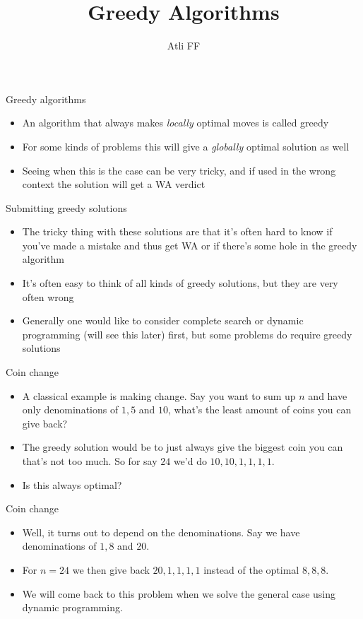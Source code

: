 \documentclass{beamer}
\title{Greedy Algorithms}
\author{Atli FF}
\institute{\href{http://ru.is/td}{School of Computer Science} \\[2pt] \href{http://ru.is}{Reykjavík University}}
\begin{document}
\maketitle

\begin{frame}[plain]{Greedy algorithms}
    \begin{itemize}
        \item An algorithm that always makes \textit{locally} optimal moves is called greedy
        \item For some kinds of problems this will give a \textit{globally} optimal solution as well
        \item Seeing when this is the case can be very tricky, and if used in the wrong context the solution will get a WA verdict
    \end{itemize}
\end{frame}

\begin{frame}[plain]{Submitting greedy solutions}
    \begin{itemize}
        \item The tricky thing with these solutions are that it's often hard to know if you've made a mistake and thus get WA or if there's some hole in the greedy algorithm
        \item It's often easy to think of all kinds of greedy solutions, but they are very often wrong
        \item Generally one would like to consider complete search or dynamic programming (will see this later) first, but some problems do require greedy solutions
    \end{itemize}
\end{frame}

\begin{frame}[plain]{Coin change}
    \begin{itemize}
        \item A classical example is making change. Say you want to sum up $n$ and have only denominations of $1, 5$ and $10$, what's the least amount of coins you can give back?
        \item The greedy solution would be to just always give the biggest coin you can that's not too much. So for say $24$ we'd do $10, 10, 1, 1, 1, 1$.
        \item Is this always optimal?
    \end{itemize}
\end{frame}

\begin{frame}[plain]{Coin change}
    \begin{itemize}
        \item Well, it turns out to depend on the denominations. Say we have denominations of $1, 8$ and $20$.
        \item For $n = 24$ we then give back $20, 1, 1, 1, 1$ instead of the optimal $8, 8, 8$.
        \item We will come back to this problem when we solve the general case using dynamic programming.
    \end{itemize}
\end{frame}
\end{document}
